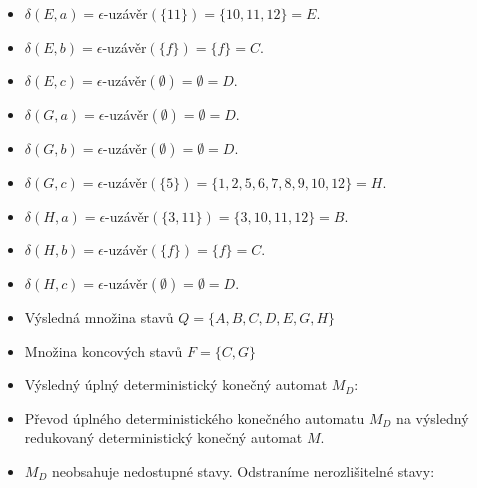 \documentclass[a4paper,11pt]{article}[24.3.2010]
\begin{document}
\begin{enumerate}
\begin{enumerate}
\begin{itemize}
        \item $\delta(E,a)=\epsilon$-uzávěr$(\{11\})=\{10,11,12\}=E$.
        \item $\delta(E,b)=\epsilon$-uzávěr$(\{f\})=\{f\}=C$.
        \item $\delta(E,c)=\epsilon$-uzávěr$(\emptyset)=\emptyset=D$.
        \item $\delta(G,a)=\epsilon$-uzávěr$(\emptyset)=\emptyset=D$.
        \item $\delta(G,b)=\epsilon$-uzávěr$(\emptyset)=\emptyset=D$.
        \item $\delta(G,c)=\epsilon$-uzávěr$(\{5\})=\{1,2,5,6,7,8,9,10,12\}=H$.
        \item $\delta(H,a)=\epsilon$-uzávěr$(\{3,11\})=\{3,10,11,12\}=B$.
        \item $\delta(H,b)=\epsilon$-uzávěr$(\{f\})=\{f\}=C$.
        \item $\delta(H,c)=\epsilon$-uzávěr$(\emptyset)=\emptyset=D$.
        \item Výsledná množina stavů $Q=\{A,B,C,D,E,G,H\}$
        \item Množina koncových stavů $F=\{C,G\}$


        \item Výsledný úplný deterministický konečný automat $M_{D}$:
        \begin{figure}[h!]
        \begin{center}
        \end{center}
        \end{figure}
 \newpage
        \item Převod úplného deterministického konečného automatu  $M_{D}$ na výsledný redukovaný deterministický konečný automat  $M$.
        \item $M_{D}$ neobsahuje nedostupné stavy. Odstraníme nerozlišitelné stavy:
        

\end{itemize}
\end{enumerate}
\end{enumerate}
\end{document}
